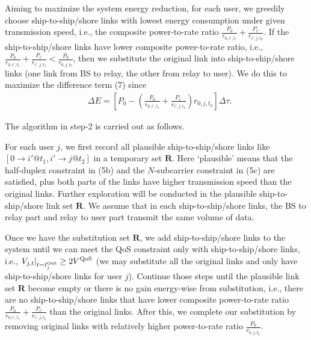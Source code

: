 \documentclass[conference]{IEEEtran}
\begin{document}
 Aiming to maximize the system energy reduction, for each user, we greedily choose ship-to-ship/shore links with lowest energy consumption under given transmission speed, i.e., the composite power-to-rate ratio $ {\frac{{{P_0}}}{{{r_{0,i',{t_1}}}}} + \frac{{{P_{i'}}}}{{{r_{i',j,{t_2}}}}}} $. If the ship-to-ship/shore links have lower composite power-to-rate ratio, i.e., $ {\frac{{{P_0}}}{{{r_{0,i',{t_1}}}}} + \frac{{{P_{i'}}}}{{{r_{i',j,{t_2}}}}}} < \frac{{{P_0}}}{{{r_{0,j,{t_0}}}}}$, then we substitute the original link into ship-to-ship/shore links (one link from BS to relay, the other from relay to user). We do this to maximize the difference term (7) since 
 \begin{align}
   &\Delta E  = \left[ {P_0}- \left( {\frac{{{P_0}}}{{{r_{0,i',{t_1}}}}} + \frac{{{P_{i'}}}}{{{r_{i',j,{t_2}}}}}} \right){r_{0,j,{t_0}}} \right] \Delta \tau.
 \end{align}

 The algorithm in step-2 is carried out as follows.
 
 For each user $j$, we first record all plausible ship-to-ship/shore links like $\left[ {0 \to i'@{t_1},i' \to j@{t_2}} \right]$ in a temporary set $\mathbf{R}$. Here `plausible' means that the half-duplex constraint in (5b) and the $N$-subcarrier constraint in (5c) are satisfied, plus both parts of the links have higher transmission speed than the original links. Further exploration will be conducted in the plausible ship-to-ship/shore link set $\mathbf{R}$. We assume that in each ship-to-ship/shore links, the BS to relay part and relay to user part transmit the same volume of data.

 Once we have the substitution set $\mathbf{R}$, we add ship-to-ship/shore links to the system until we can meet the QoS constraint only with ship-to-ship/shore links, i.e., ${\left. {{V_{j,t}}} \right|_{t = t_j^{{\rm{Out}}}}} \ge 2{V^{\rm{QoS}}}$ (we may substitute all the original links and only have ship-to-ship/shore links for user $j$). Continue those steps until the plausible link set $\mathbf{R}$ become empty or there is no gain energy-wise from substitution, i.e., there are no ship-to-ship/shore links that have lower composite power-to-rate ratio $ {\frac{{{P_0}}}{{{r_{0,i',{t_1}}}}} + \frac{{{P_{i'}}}}{{{r_{i',j,{t_2}}}}}} $ than the original links. 
 After this, we complete our substitution by removing original links with relatively higher power-to-rate ratio ${\frac{P_0}{r_{0,j,{t_0}}}}$.
\end{document}
